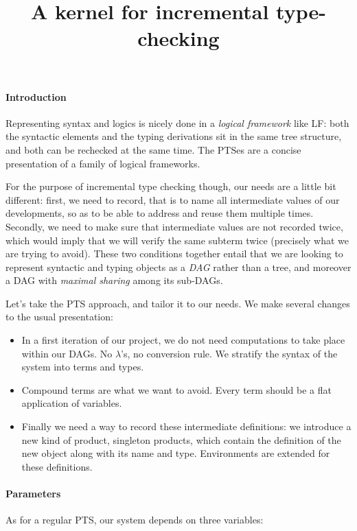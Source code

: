 \documentclass[12pt]{article}
\title{A kernel for incremental type-checking}
\begin{document}
\maketitle

\paragraph{Introduction}

Representing syntax and logics is nicely done in a \emph{logical
  framework} like LF: both the syntactic elements and the typing
derivations sit in the same tree structure, and both can be rechecked
at the same time. The PTSes are a concise presentation of a family of
logical frameworks.

For the purpose of incremental type checking though, our needs are a
little bit different: first, we need to record, that is to name all
intermediate values of our developments, so as to be able to address
and reuse them multiple times. Secondly, we need to make sure that
intermediate values are not recorded twice, which would imply that we
will verify the same subterm twice (precisely what we are trying to
avoid). These two conditions together entail that we are looking to
represent syntactic and typing objects as a \emph{DAG} rather than a
tree, and moreover a DAG with \emph{maximal sharing} among its
sub-DAGs.

Let's take the PTS approach, and tailor it to our needs. We make
several changes to the usual presentation:
\begin{itemize}
\item In a first iteration of our project, we do not need computations
  to take place within our DAGs. No $\lambda$'s, no conversion
  rule. We stratify the syntax of the system into terms and types.
\item Compound terms are what we want to avoid. Every term should be a
  flat application of variables. 
\item Finally we need a way to record these intermediate definitions:
  we introduce a new kind of product, singleton products, which
  contain the definition of the new object along with its name and
  type. Environments are extended for these definitions.
\end{itemize}

\paragraph{Parameters}

As for a regular PTS, our system depends on three variables:
\end{document}
